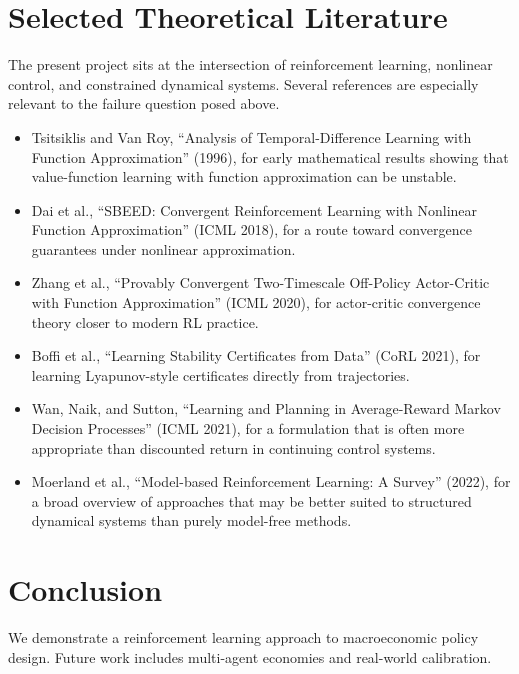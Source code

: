 \documentclass[11pt]{article}
\begin{document}
\section{Selected Theoretical Literature}
The present project sits at the intersection of reinforcement learning, nonlinear control, and constrained dynamical systems. Several references are especially relevant to the failure question posed above.

\begin{itemize}
    \item Tsitsiklis and Van Roy, ``Analysis of Temporal-Difference Learning with Function Approximation'' (1996), for early mathematical results showing that value-function learning with function approximation can be unstable.
    \item Dai et al., ``SBEED: Convergent Reinforcement Learning with Nonlinear Function Approximation'' (ICML 2018), for a route toward convergence guarantees under nonlinear approximation.
    \item Zhang et al., ``Provably Convergent Two-Timescale Off-Policy Actor-Critic with Function Approximation'' (ICML 2020), for actor-critic convergence theory closer to modern RL practice.
    \item Boffi et al., ``Learning Stability Certificates from Data'' (CoRL 2021), for learning Lyapunov-style certificates directly from trajectories.
    \item Wan, Naik, and Sutton, ``Learning and Planning in Average-Reward Markov Decision Processes'' (ICML 2021), for a formulation that is often more appropriate than discounted return in continuing control systems.
    \item Moerland et al., ``Model-based Reinforcement Learning: A Survey'' (2022), for a broad overview of approaches that may be better suited to structured dynamical systems than purely model-free methods.
\end{itemize}

\section{Conclusion}
We demonstrate a reinforcement learning approach to macroeconomic policy design. Future work includes multi-agent economies and real-world calibration.
\end{document}
